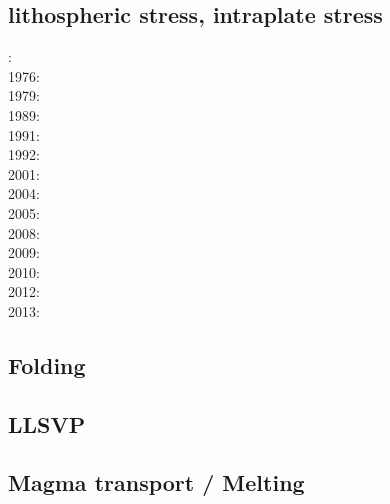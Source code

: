 \cite{baeg14}


\subsection*{lithospheric stress, intraplate stress}

: \cite{fouy75}\\
1976: \cite{riso76}\\
1979: \cite{riso79}\\
1989: \cite{boww89}\\
1991: \cite{worg91}\\
1992: \cite{rich92}\cite{wuvr92}\cite{zoba92}\cite{clko92}\\
2001: \cite{stsm01}\\
2004: \cite{ligu04}\\
2005: \cite{timr05}\\
2008: \cite{bilr08}\cite{ghhw08}\\
2009: \cite{ghhf09}\cite{nacl09}\\
2010: \cite{bepo10}\\
2012: \cite{nalr12}\cite{ghho12}\\
2013: \cite{ghhw13}


\subsection*{Folding}

\noindent
\cite{ramb68}
\cite{ramb70}
\cite{ramb71}
\cite{reds12}
\cite{regc13}

\subsection*{LLSVP}

\cite{stto10}
\cite{stto12}
\cite{limc13}\cite{bogs13a}
\cite{budt14}
\cite{musd15}\cite{hafg15}
\cite{dost16}


\subsection*{Magma transport / Melting}

\cite{yatd12}
\cite{lorg18}

